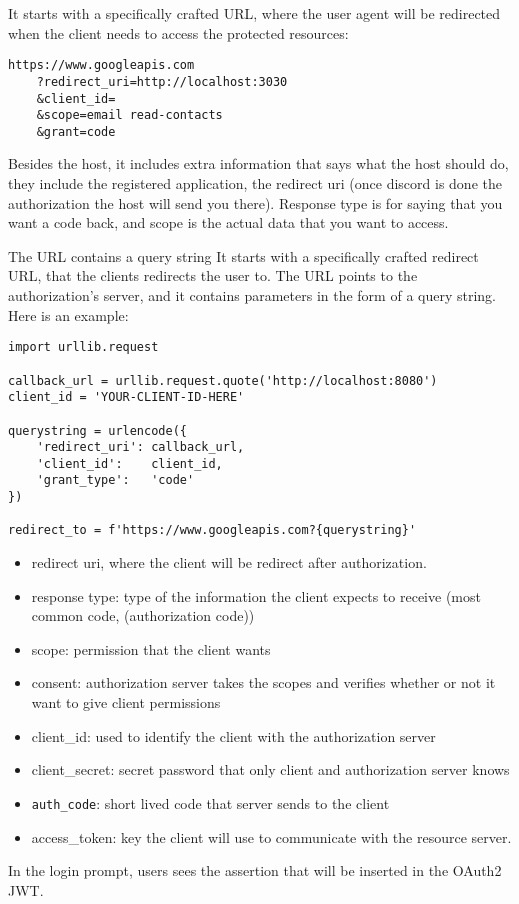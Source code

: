 It starts with a specifically crafted URL, where the user agent will be
redirected when the client needs to access the protected resources:

\begin{lstlisting}
https://www.googleapis.com
    ?redirect_uri=http://localhost:3030
    &client_id=
    &scope=email read-contacts
    &grant=code
\end{lstlisting}

Besides the host, it includes extra
information that says what the host should do, they include the registered
application, the redirect uri (once discord is done the authorization the host
will send you there). Response type is for saying that you want a code back, and
scope is the actual data that you want to access.

The URL contains a query string
It starts with a specifically crafted redirect URL, that the clients
redirects the user to.
The URL points to the authorization's server, and it contains parameters in the
form of a query string. Here is an example:

\begin{lstlisting}
import urllib.request

callback_url = urllib.request.quote('http://localhost:8080')
client_id = 'YOUR-CLIENT-ID-HERE'

querystring = urlencode({
    'redirect_uri': callback_url,
    'client_id':    client_id,
    'grant_type':   'code'
})

redirect_to = f'https://www.googleapis.com?{querystring}'
\end{lstlisting}


\begin{itemize}
    \item  redirect uri, where the client will be redirect after authorization.
    \item  response type: type of the information the client expects to receive
        (most common code, (authorization code))
    \item  scope: permission that the client wants
    \item  consent: authorization server takes the scopes and verifies whether or not
        it want to give client permissions
    \item  client\_id: used to identify the client with the authorization server
    \item  client\_secret: secret password that only client and authorization server knows
    \item  \texttt{auth\_code}: short lived code that server sends to the client
    \item access\_token: key the client will use to communicate with the resource server.
\end{itemize}

In the login prompt, users sees the assertion that will be inserted in the
OAuth2 JWT.
